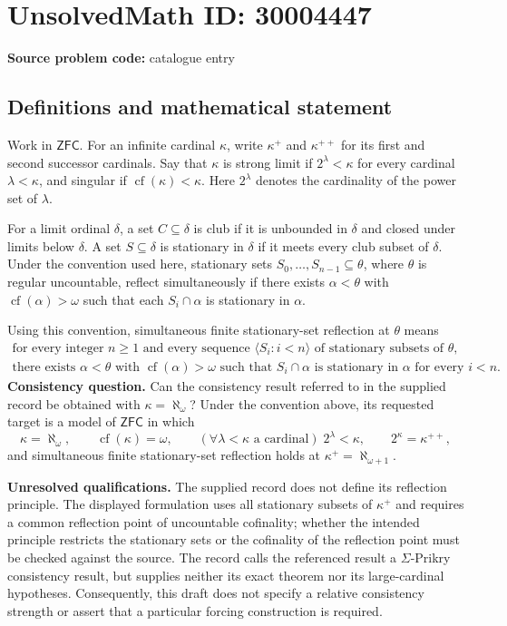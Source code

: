 \documentclass[11pt]{article}
\begin{document}
\section*{UnsolvedMath ID: 30004447}
\textbf{Source problem code:} catalogue entry
\subsection{Definitions and mathematical statement}
Work in \(\mathsf{ZFC}\). For an infinite cardinal \(\kappa\), write \(\kappa^+\) and \(\kappa^{++}\) for its first and second successor cardinals. Say that \(\kappa\) is strong limit if \(2^\lambda<\kappa\) for every cardinal \(\lambda<\kappa\), and singular if \(\operatorname{cf}(\kappa)<\kappa\). Here \(2^\lambda\) denotes the cardinality of the power set of \(\lambda\).

For a limit ordinal \(\delta\), a set \(C\subseteq\delta\) is club if it is unbounded in \(\delta\) and closed under limits below \(\delta\). A set \(S\subseteq\delta\) is stationary in \(\delta\) if it meets every club subset of \(\delta\). Under the convention used here, stationary sets \(S_0,\ldots,S_{n-1}\subseteq\theta\), where \(\theta\) is regular uncountable, reflect simultaneously if there exists \(\alpha<\theta\) with \(\operatorname{cf}(\alpha)>\omega\) such that each \(S_i\cap\alpha\) is stationary in \(\alpha\).

Using this convention, simultaneous finite stationary-set reflection at \(\theta\) means
\[
\begin{gathered}
\text{for every integer }n\geq 1\text{ and every sequence }\langle S_i:i<n\rangle
\text{ of stationary subsets of }\theta,\\
\text{there exists }\alpha<\theta\text{ with }\operatorname{cf}(\alpha)>\omega
\text{ such that }S_i\cap\alpha\text{ is stationary in }\alpha
\text{ for every }i<n.
\end{gathered}
\]
\textbf{Consistency question.} Can the consistency result referred to in the supplied record be obtained with \(\kappa=\aleph_\omega\)? Under the convention above, its requested target is a model of \(\mathsf{ZFC}\) in which
\[
\kappa=\aleph_\omega,\qquad
\operatorname{cf}(\kappa)=\omega,\qquad
(\forall\lambda<\kappa\text{ a cardinal})\;2^\lambda<\kappa,
\qquad 2^\kappa=\kappa^{++},
\]
and simultaneous finite stationary-set reflection holds at \(\kappa^+=\aleph_{\omega+1}\).

\textbf{Unresolved qualifications.} The supplied record does not define its reflection principle. The displayed formulation uses all stationary subsets of \(\kappa^+\) and requires a common reflection point of uncountable cofinality; whether the intended principle restricts the stationary sets or the cofinality of the reflection point must be checked against the source. The record calls the referenced result a \(\Sigma\)-Prikry consistency result, but supplies neither its exact theorem nor its large-cardinal hypotheses. Consequently, this draft does not specify a relative consistency strength or assert that a particular forcing construction is required.
\end{document}
